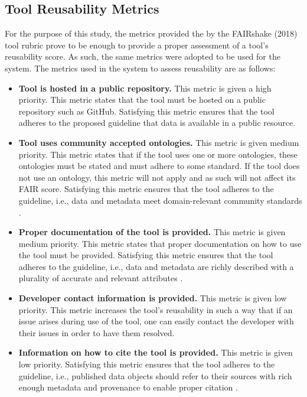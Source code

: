 \documentclass{cisfyp}
\begin{document}
\subsection{Tool Reusability Metrics}
For the purpose of this study, the metrics provided the by the FAIRshake (2018) tool rubric prove to be enough to provide a proper assessment of a tool's reusability score. As such, the same metrics were adopted to be used for the system.\newline
The metrics used in the system to assess reusability are as follows:
\begin{itemize}
	\item \textbf{Tool is hosted in a public repository.}\newline
	This metric is given a high priority. This metric states that the tool must be hosted on a public repository such as GitHub. Satisfying this metric ensures that the tool adheres to the proposed guideline that data is available in a public resource.
	
	\item \textbf{Tool uses community accepted ontologies.}\newline
	This metric is given medium priority. This metric states that if the tool uses one or more ontologies, these ontologies must be stated and must adhere to some standard. If the tool does not use an ontology, this metric will not apply and as such will not affect its FAIR score. Satisfying this metric ensures that the tool adheres to the guideline, i.e., data and metadata meet domain-relevant community standards \cite{Wilkinson2016}.
	
	\item \textbf{Proper documentation of the tool is provided.}\newline
	This metric is given medium priority. This metric states that proper documentation on how to use the tool must be provided. Satisfying this metric ensures that the tool adheres to the guideline, i.e., data and metadata are richly described with a plurality of accurate and relevant attributes \cite{Wilkinson2016}.
	
	\item \textbf{Developer contact information is provided.}\newline
	This metric is given low priority. This metric increases the tool's reusability in such a way that if an issue arises during use of the tool, one can easily contact the developer with their issues in order to have them resolved.
	
	\item \textbf{Information on how to cite the tool is provided.}\newline
	This metric is given low priority. Satisfying this metric ensures that the tool adheres to the guideline, i.e., published data objects should refer to their sources with rich enough metadata and provenance to enable proper citation \cite{Wilkinson2016}.
\end{itemize}
\end{document}
